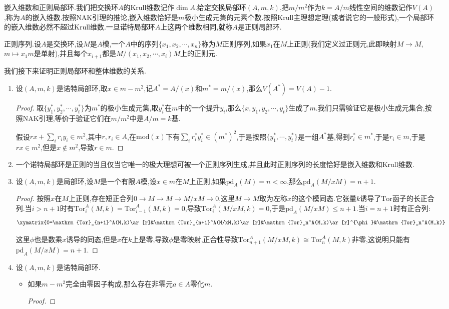 嵌入维数和正则局部环.我们把交换环$A$的Krull维数记作$\dim A$.给定交换局部环$(A,m,k)$,把$m/m^2$作为$k=A/m$线性空间的维数记作$V(A)$,称为$A$的嵌入维数.按照NAK引理的推论,嵌入维数恰好是$m$极小生成元集的元素个数.按照Krull主理想定理(或者说它的一般形式),一个局部环的嵌入维数必然不超过Krull维数.一旦诺特局部环$A$上这两个维数相同,就称$A$是正则局部环.

正则序列.设$A$是交换环,设$M$是$A$模,一个$A$中的序列$\{x_1,x_2,\cdots,x_n\}$称为$M$正则序列,如果$x_1$在$M$上正则(我们定义过正则元,此即映射$M\to M$,$m\mapsto x_1m$是单射),并且每个$x_{i+1}$都是$M/(x_1,x_2,\cdots,x_i)M$上的正则元.

我们接下来证明正则局部环和整体维数的关系.
\begin{enumerate}
	\item 设$(A,m,k)$是诺特局部环,取$x\in m-m^2$,记$A^*=A/(x)$和$m^*=m/(x)$,那么$V(A^*)=V(A)-1$.
	\begin{proof}
		
		取$\{y_1^*,y_2^*,\cdots,y_t^*\}$为$m^*$的极小生成元集,取$y_i^*$在$m$中的一个提升$y_i$,那么$\{x,y_1,y_2,\cdots,y_t\}$生成了$m$.我们只需验证它是极小生成元集合,按照NAK引理,等价于验证它们在$m/m^2$中是$A/m=k$基.
		
		假设$rx+\sum_ir_iy_i\in m^2$,其中$r,r_i\in A$,在$\mathrm{mod}(x)$下有$\sum_ir_i^*y_i^*\in (m^*)^2$,于是按照$\{y_1^*,\cdots,y_t^*\}$是一组$A^*$基,得到$r_i^*\in m^*$,于是$r_i\in m$,于是$rx\in m^2$,但是$x\not\in m^2$,导致$r\in m$.
	\end{proof}
	\item 一个诺特局部环是正则的当且仅当它唯一的极大理想可被一个正则序列生成,并且此时正则序列的长度恰好是嵌入维数和Krull维数.
	\item 设$(A,m,k)$是局部环,设$M$是一个有限$A$模,设$x\in m$在$M$上正则,如果$\mathrm{pd}_A(M)=n<\infty$,那么$\mathrm{pd}_A(M/xM)=n+1$.
	\begin{proof}
		
		按照$x$在$M$上正则,存在短正合列$0\to M\to M\to M/xM\to0$,这里$M\to M$取为左称$x$的这个模同态.它张量$k$诱导了$\mathrm{Tor}$函子的长正合列.当$i>n+1$时有$\mathrm{Tor}_i^A(M,k)=\mathrm{Tor}_{i-1}^A(M,k)=0$,导致$\mathrm{Tor}_i^A(M/xM,k)=0$,于是$\mathrm{pd}_A(M/xM)\le n+1$.当$i=n+1$时有正合列:
		$$\xymatrix{0=\mathrm{Tor}_{n+1}^A(M,k)\ar[r]&\mathrm{Tor}_{n+1}^A(M/xM,k)\ar[r]&\mathrm{Tor}_n^A(M,k)\ar[r]^{\phi}&\mathrm{Tor}_n^A(M,k)}$$
		
		这里$\phi$也是数乘$x$诱导的同态,但是$x$在$k$上是零,导致$\phi$是零映射,正合性导致$\mathrm{Tor}_{n+1}^A(M/xM,k)\cong\mathrm{Tor}_n^A(M,k)$非零,这说明只能有$\mathrm{pd}_A(M/xM)=n+1$.
	\end{proof}
    \item 设$(A,m,k)$是诺特局部环.
    \begin{itemize}
    	\item 如果$m-m^2$完全由零因子构成,那么存在非零元$a\in A$零化$m$.
    	\begin{proof}
    		

\end{proof}
\end{itemize}
\end{enumerate}
